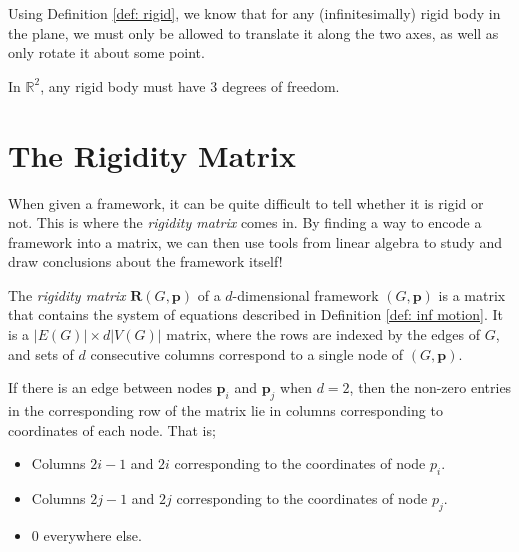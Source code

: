 \begin{flushleft}
Using Definition \ref{def: rigid}, we know that for any (infinitesimally) rigid body in the plane, we must only be allowed to translate it along the two axes, as well as only rotate it about some point.
\end{flushleft}

\begin{theorem}
\label{thm: degrees of rigid body}
In $\mathbb{R}^2$, any rigid body must have $3$ degrees of freedom. 
\end{theorem}

\section{The Rigidity Matrix}

\begin{flushleft}
When given a framework, it can be quite difficult to tell whether it is rigid or not. This is where the \textit{rigidity matrix} comes in. By finding a way to encode a framework into a matrix, we can then use tools from linear algebra to study and draw conclusions about the framework itself!
\end{flushleft}

\begin{definition}
\label{def: rigidity matrix}
The \textit{rigidity matrix} $\mathbf{R}(G,\mathbf{p})$ of a $d$-dimensional framework $(G,\mathbf{p})$ is a matrix that contains the system of equations described in Definition \ref{def: inf motion}. It is a $|E(G)| \times d|V(G)|$ matrix, where the rows are indexed by the edges of $G$, and sets of $d$ consecutive columns correspond to a single node of $(G,\mathbf{p})$. 

\noindent
If there is an edge between nodes $\mathbf{p}_i$ and $\mathbf{p}_j$ when $d=2$, then the non-zero entries in the corresponding row of the matrix lie in columns corresponding to coordinates of each node. That is;
\begin{itemize}
    \item Columns $2i-1$ and $2i$ corresponding to the coordinates of node $p_i$.
    \item Columns $2j-1$ and $2j$ corresponding to the coordinates of node $p_j$.
    \item $0$ everywhere else.
\end{itemize}
\end{definition}

